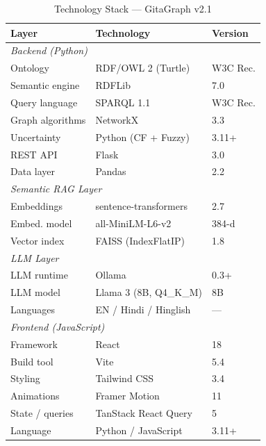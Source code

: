 \documentclass[conference]{IEEEtran}
\begin{document}
\begin{table}[htbp]
\caption{Technology Stack — GitaGraph v2.1}
\label{tab:tech}
\centering
\begin{tabular}{p{2.8cm}p{5.2cm}p{2.0cm}}
\toprule
\textbf{Layer} & \textbf{Technology} & \textbf{Version} \\
\midrule
\multicolumn{3}{l}{\textit{Backend (Python)}} \\
Ontology          & RDF/OWL 2 (Turtle)        & W3C Rec. \\
Semantic engine   & RDFLib                    & 7.0 \\
Query language    & SPARQL 1.1                & W3C Rec. \\
Graph algorithms  & NetworkX                  & 3.3 \\
Uncertainty       & Python (CF + Fuzzy)       & 3.11+ \\
REST API          & Flask                     & 3.0 \\
Data layer        & Pandas                    & 2.2 \\
\multicolumn{3}{l}{\textit{Semantic RAG Layer}} \\
Embeddings        & sentence-transformers     & 2.7 \\
Embed. model      & all-MiniLM-L6-v2          & 384-d \\
Vector index      & FAISS (IndexFlatIP)       & 1.8 \\
\multicolumn{3}{l}{\textit{LLM Layer}} \\
LLM runtime       & Ollama                    & 0.3+ \\
LLM model         & Llama 3 (8B, Q4\_K\_M)    & 8B \\
Languages         & EN / Hindi / Hinglish     & — \\
\multicolumn{3}{l}{\textit{Frontend (JavaScript)}} \\
Framework         & React                     & 18 \\
Build tool        & Vite                      & 5.4 \\
Styling           & Tailwind CSS              & 3.4 \\
Animations        & Framer Motion             & 11 \\
State / queries   & TanStack React Query      & 5 \\
\midrule
Language          & Python / JavaScript       & 3.11+ \\
\bottomrule
\end{tabular}
\end{table}
\end{document}
